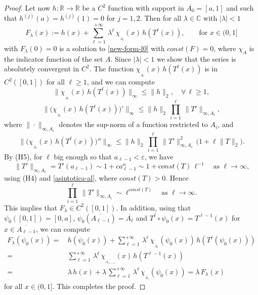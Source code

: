 \documentclass[11pt]{amsart}
\theoremstyle{definition}
\theoremstyle{remark}
\theoremstyle{definition}
\numberwithin{equation}{section}
\newcommand{\R}{\mathbb R}
\newcommand{\C}{\mathbb C}
\newcommand{\eps}{\varepsilon}
\begin{document}
\begin{proof}
Let now $h:\R \to \R$ be a $C^2$ function with support in $\overline{A_0} =[a,1]$ and such that $h^{(j)}(a) = h^{(j)}(1) =0$ for $j=1,2$. Then for all $\lambda \in \C$ with $|\lambda|<1$
\begin{equation}\label{f-lambda}
F_\lambda(x) := h(x) + \sum_{\ell=1}^{+\infty}\, \lambda^\ell\, \chi_{_{\overline{A_\ell}}}(x)\, h(T^\ell(x)),\qquad \text{for $x\in (0,1]$}
\end{equation}
with $F_\lambda(0)=0$ is a solution to \eqref{new-form-l0} with $const(F)=0$, where $\chi_{A}$ is the indicator function of the set $A$. Since $|\lambda|<1$ we show that the series is absolutely convergent in $C^2$. The function $\chi_{_{\overline{A_\ell}}}(x)\, h(T^\ell(x))$ is in $C^2([0,1])$ for all $\ell\ge 1$, and we can compute
\[
\| \chi_{_{\overline{A_\ell}}}(x)\, h(T^\ell(x)) \|_\infty \le \|h\|_2, \quad \forall\, \ell\ge 1,
\]  
\[
\| \Big( \chi_{_{\overline{A_\ell}}}(x)\, h(T^\ell(x)) \Big)' \|_\infty \le \| h\|_2\, \prod_{i=1}^{\ell}\, \| T' \|_{\infty,A_i},
\]
where $\|\cdot\|_{\infty,A_i}$ denotes the sup-norm of a function restricted to $A_i$, and
\[
\| \Big( \chi_{_{\overline{A_\ell}}}(x)\, h(T^\ell(x)) \Big)'' \|_\infty \le \| h\|_2\, \prod_{i=1}^{\ell}\, \| T' \|_{\infty,A_i}^2\, \Big(1+ \ell \|T\|_2\Big).
\]
By (H5), for $\ell$ big enough so that $a_{\ell-1}<\eps$, we have 
\[
\| T' \|_{\infty,A_\ell} = T'(a_{\ell-1}) \sim 1 + c a_{\ell-1}^\alpha \sim 1 + const(T) \, \ell^{-1} \quad \text{as $\ell \to \infty$,}
\]
using (H4) and \eqref{asintotica-al}, where $const(T)>0$. Hence
\[
\prod_{i=1}^{\ell}\, \| T' \|_{\infty,A_i} \sim \ell^{const(T)} \quad \text{as $\ell \to \infty$.}
\]
This implies that $F_\lambda \in C^2([0,1])$. In addition, using that $\psi_0([0,1]) = [0,a]$, $\psi_0(\overline{A_{\ell-1}}) = \overline{A_\ell}$ and $T^\ell \circ \psi_0(x) = T^{\ell-1}(x)$ for $x\in\overline{A_{\ell-1}}$, we can compute 
\[
\begin{aligned}
F_\lambda(\psi_0(x)) =\, & h(\psi_0(x)) + \sum_{\ell=1}^{+\infty}\, \lambda^\ell\, \chi_{_{\overline{A_\ell}}}(\psi_0(x))\, h(T^\ell(\psi_0(x))) \\
=\, & \sum_{\ell=1}^{+\infty}\, \lambda^\ell\, \chi_{_{\overline{A_{\ell-1}}}}(x)\, h(T^{\ell-1}(x)) \\
=\, & \lambda\, h(x) + \lambda\, \sum_{\ell=1}^{+\infty}\, \lambda^\ell\, \chi_{_{\overline{A_\ell}}}(\psi_0(x)) = \lambda\, F_\lambda(x)
\end{aligned}
\]
for all $x\in (0,1]$. This completes the proof.
\end{proof}
\end{document}
